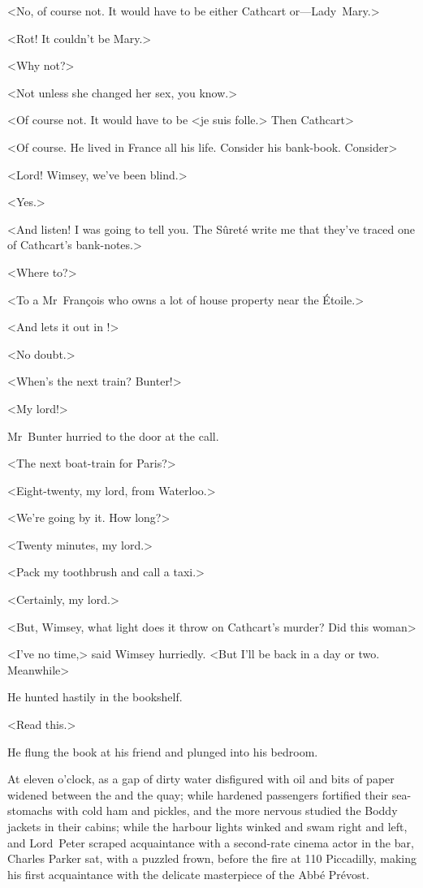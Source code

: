 <No, of course not. It would have to be either Cathcart or—Lady~Mary.>

<Rot! It couldn't be Mary.>

<Why not?>

<Not unless she changed her sex, you know.>

<Of course not. It would have to be <je suis folle.> Then Cathcart\longdash>

<Of course. He lived in France all his life. Consider his bank-book. Consider\longdash>

<Lord! Wimsey, we've been blind.>

<Yes.>

<And listen! I was going to tell you. The Sûreté write me that they've traced one of Cathcart's bank-notes.>

<Where to?>

<To a Mr~François who owns a lot of house property near the Étoile.>

<And lets it out in !>

<No doubt.>

<When's the next train? Bunter!>

<My lord!>

Mr~Bunter hurried to the door at the call.

<The next boat-train for Paris?>

<Eight-twenty, my lord, from Waterloo.>

<We're going by it. How long?>

<Twenty minutes, my lord.>

<Pack my toothbrush and call a taxi.>

<Certainly, my lord.>

<But, Wimsey, what light does it throw on Cathcart's murder? Did this woman\longdash>

<I've no time,> said Wimsey hurriedly. <But I'll be back in a day or two. Meanwhile\longdash>

He hunted hastily in the bookshelf.

<Read this.>

He flung the book at his friend and plunged into his bedroom.

At eleven o'clock, as a gap of dirty water disfigured with oil and bits of paper widened between the  and the quay; while hardened passengers fortified their sea-stomachs with cold ham and pickles, and the more nervous studied the Boddy jackets in their cabins; while the harbour lights winked and swam right and left, and Lord~Peter scraped acquaintance with a second-rate cinema actor in the bar, Charles Parker sat, with a puzzled frown, before the fire at 110 Piccadilly, making his first acquaintance with the delicate masterpiece of the Abbé Prévost.

